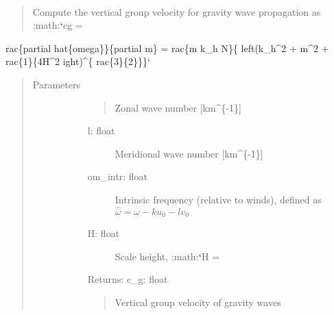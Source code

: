 \documentclass[letterpaper,10pt,english]{sphinxmanual}
\begin{document}

\begin{fulllineitems}
\label{\detokenize{stochprop.gravity:stochprop.gravity_waves.cg}}~\begin{quote}

Compute the vertical group velocity for gravity wave propagation 
as :math:{\color{red}\bfseries{}{}`}cg =
\end{quote}

rac\{partial hat\{omega\}\}\{partial m\} = 
rac\{m k\_h N\}\{ left(k\_h\textasciicircum{}2 + m\textasciicircum{}2 + 
rac\{1\}\{4H\textasciicircum{}2 
ight)\textasciicircum{}\{
rac\{3\}\{2\}\}\}{}`
\begin{quote}\begin{description}
\item[{Parameters}] \leavevmode\begin{description}
\item[{}] \leavevmode\begin{quote}

Zonal wave number {[}km\textasciicircum{}\{-1\}{]}
\end{quote}
\begin{description}
\item[{l: float}] \leavevmode
Meridional wave number {[}km\textasciicircum{}\{-1\}{]}

\item[{om\_intr: float}] \leavevmode
Intrinsic frequency (relative to winds), defined as \(\hat{\omega} = \omega - k u_0 - l v_0\)

\item[{H: float}] \leavevmode
Scale height, :math:{\color{red}\bfseries{}{}`}H =

\end{description}

\item[{}] \leavevmode
\item[{}] \leavevmode
\item[{}] \leavevmode
\item[{}] \leavevmode
Returns:
c\_g: float
\begin{quote}

Vertical group velocity of gravity waves
\end{quote}

\end{description}

\end{description}\end{quote}

\end{fulllineitems}
\end{document}
